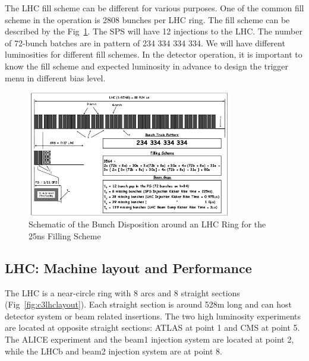 The LHC fill scheme can be different for various purposes. One of the common fill scheme in the operation is 2808 bunches per LHC ring. The fill scheme can be described by the Fig~\ref{fig:c3lhcfillscheme}. The SPS will have 12 injections to the LHC. The number of 72-bunch batches are in pattern of 234 334 334 334. We will have different luminosities for different fill schemes. In the detector operation, it is important to know the fill scheme and expected luminosity in advance to design the trigger menu in different bias level. 

\begin{figure}[htbp]
 \begin{center}
  \includegraphics[width=0.8\textwidth]{figures/c3/c3_lhc_fillscheme.png}
 \end{center}
 \caption{Schematic of the Bunch Disposition around an LHC Ring for the 25ns Filling Scheme}
 \label{fig:c3lhcfillscheme}
\end{figure}

\subsection{LHC: Machine layout and Performance}

The LHC is a near-circle ring with 8 arcs and 8 straight sections (Fig~\ref{fig:c3lhclayout}). Each straight section is around 528m long and can host detector system or beam related insertions. The two high luminosity experiments are located at opposite straight sections: ATLAS at point 1 and CMS at point 5. The ALICE experiment and the beam1 injection system are located at point 2, while the LHCb and beam2 injection system are at point 8. 

